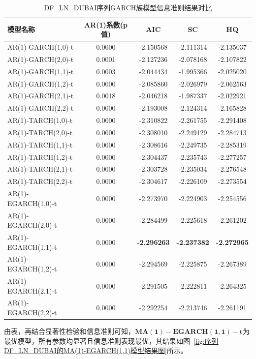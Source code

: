 \documentclass[12pt,a4paper]{ctexart}
\begin{document}
\begin{table}[H]
\centering
\caption{DF\_LN\_DUBAI序列GARCH族模型信息准则结果对比}
\label{tab:garch_info_criteria_dubai}
\setlength{\tabcolsep}{12pt}
\begin{tabular}{lcccc}
\toprule[1.2pt]
模型名称 & AR(1)系数(p值) & AIC & SC & HQ \\
\midrule[0.75pt]
AR(1)-GARCH(1,0)-t     & 0.0000 & -2.150568 & -2.111314 & -2.135037 \\
AR(1)-GARCH(2,0)-t     & 0.0001 & -2.127236 & -2.078168 & -2.107822 \\
AR(1)-GARCH(1,1)-t     & 0.0003 & -2.044434 & -1.995366 & -2.025020 \\
AR(1)-GARCH(1,2)-t     & 0.0000 & -2.085860 & -2.026979 & -2.062563 \\
AR(1)-GARCH(2,1)-t     & 0.0018 & -2.046218 & -1.987337 & -2.022921 \\
AR(1)-GARCH(2,2)-t     & 0.0000 & -2.193008 & -2.124314 & -2.165828 \\
\midrule
AR(1)-TARCH(1,0)-t     & 0.0000 & -2.310822 & -2.261755 & -2.291408 \\
AR(1)-TARCH(2,0)-t     & 0.0000 & -2.308010 & -2.249129 & -2.284713 \\
AR(1)-TARCH(1,1)-t     & 0.0000 & -2.308616 & -2.249735 & -2.285319 \\
AR(1)-TARCH(1,2)-t     & 0.0000 & -2.304437 & -2.235743 & -2.277257 \\
AR(1)-TARCH(2,1)-t     & 0.0000 & -2.303728 & -2.235034 & -2.276548 \\
AR(1)-TARCH(2,2)-t     & 0.0000 & -2.304617 & -2.226109 & -2.273554 \\
\midrule
AR(1)-EGARCH(1,0)-t    & 0.0000 & -2.273970 & -2.224903 & -2.254556 \\
AR(1)-EGARCH(2,0)-t    & 0.0000 & -2.284499 & -2.225618 & -2.261202 \\
AR(1)-EGARCH(1,1)-t    & 0.0000 & \textbf{-2.296263} & \textbf{-2.237382} & \textbf{-2.272965} \\
AR(1)-EGARCH(1,2)-t    & 0.0000 & -2.294569 & -2.225875 & -2.267389 \\
AR(1)-EGARCH(2,1)-t    & 0.0000 & -2.291505 & -2.222811 & -2.264325 \\
AR(1)-EGARCH(2,2)-t    & 0.0000 & -2.292254 & -2.213746 & -2.261191 \\
\bottomrule[1.2pt]
\end{tabular}
\end{table}

由表，再结合显著性检验和信息准则可知，$\mathbf{MA}(\mathbf{1})-\mathbf{EGARCH}(\mathbf{1},\mathbf{1})-\mathbf{t}$为最优模型，所有参数均显著且信息准则表现最优，其结果如图~\ref{fig:序列DF_LN_DUBAI的MA(1)-EGARCH(1,1)模型结果图}所示。
\end{document}
